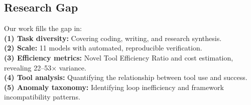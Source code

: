 \subsection{Research Gap}

Our work fills the gap in:\\
\textbf{(1) Task diversity:} Covering coding, writing, and research synthesis.\\
\textbf{(2) Scale:} 11 models with automated, reproducible verification.\\
\textbf{(3) Efficiency metrics:} Novel Tool Efficiency Ratio and cost estimation, revealing 22--53$\times$ variance.\\
\textbf{(4) Tool analysis:} Quantifying the relationship between tool use and success.\\
\textbf{(5) Anomaly taxonomy:} Identifying loop inefficiency and framework incompatibility patterns.
